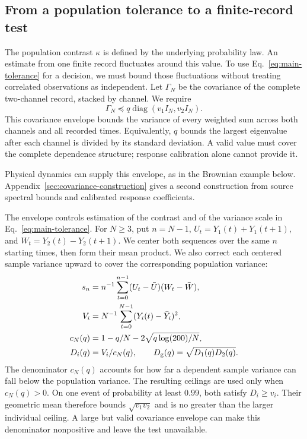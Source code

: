 \subsection{From a population tolerance to a finite-record test}
The population contrast $\kappa$ is defined by the underlying probability law. An estimate from one finite record fluctuates around this value. To use Eq.~\eqref{eq:main-tolerance} for a decision, we must bound those fluctuations without treating correlated observations as independent. Let $\Gamma_N$ be the covariance of the complete two-channel record, stacked by channel. We require
\begin{equation}
 \Gamma_N\preceq q\operatorname{diag}(v_1I_N,v_2I_N).
 \label{eq:main-envelope}
\end{equation}
This covariance envelope bounds the variance of every weighted sum across both channels and all recorded times. Equivalently, $q$ bounds the largest eigenvalue after each channel is divided by its standard deviation. A valid value must cover the complete dependence structure; response calibration alone cannot provide it.

Physical dynamics can supply this envelope, as in the Brownian example below. Appendix~\ref{sec:covariance-construction} gives a second construction from source spectral bounds and calibrated response coefficients.

The envelope controls estimation of the contrast and of the variance scale in Eq.~\eqref{eq:main-tolerance}. For $N\ge3$, put $n=N-1$, $U_t=Y_1(t)+Y_1(t+1)$, and $W_t=Y_2(t)-Y_2(t+1)$. We center both sequences over the same $n$ starting times, then form their mean product. We also correct each centered sample variance upward to cover the corresponding population variance:
\begin{align}
 s_n&=n^{-1}\sum_{t=0}^{n-1}(U_t-\bar U)(W_t-\bar W),\label{eq:main-stat}\\
 V_i&=N^{-1}\sum_{t=0}^{N-1}(Y_i(t)-\bar Y_i)^2,\\
 c_N(q)&=1-q/N-2\sqrt{q\log(200)/N},\label{eq:main-c}\\
 D_i(q)&=V_i/c_N(q),\qquad D_{\rm g}(q)=\sqrt{D_1(q)D_2(q)}.
 \label{eq:main-d}
\end{align}
The denominator $c_N(q)$ accounts for how far a dependent sample variance can fall below the population variance. The resulting ceilings are used only when $c_N(q)>0$. On one event of probability at least $0.99$, both satisfy $D_i\ge v_i$. Their geometric mean therefore bounds $\sqrt{v_1v_2}$ and is no greater than the larger individual ceiling. A large but valid covariance envelope can make this denominator nonpositive and leave the test unavailable.

